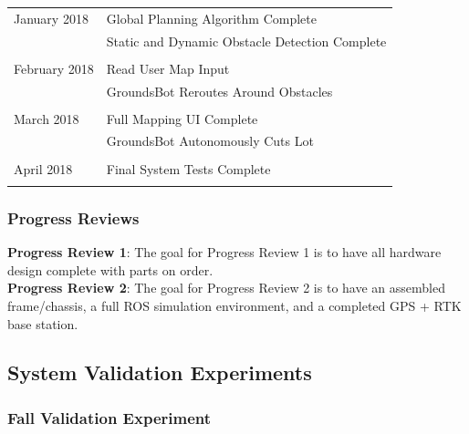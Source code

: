 \documentclass[12pt]{extarticle}
\begin{document}
\begin{table}[H]
\begin{tabular}{ll}
January 2018

    &Global Planning Algorithm Complete          \\
    &Static and Dynamic Obstacle Detection Complete\\
                                               \\
February 2018
  
    &Read User Map Input                        \\
    &GroundsBot Reroutes Around Obstacles       \\
                                              \\
March 2018 
  
    &Full Mapping UI Complete                   \\
    &GroundsBot Autonomously Cuts Lot           \\
                                              \\
April 2018 

    &Final System Tests Complete                \\                                            \\
\end{tabular}

\end{table}

\subsubsection{Progress Reviews}
\noindent
\textbf{Progress Review 1}: The goal for Progress Review 1 is to have all hardware design complete with parts on order. \\
 \textbf{Progress Review 2}: The goal for Progress Review 2 is to have an assembled frame/chassis, a full ROS simulation environment, and a completed GPS + RTK base station.\\

\subsection{System Validation Experiments}
\subsubsection{Fall Validation Experiment}
\end{document}
